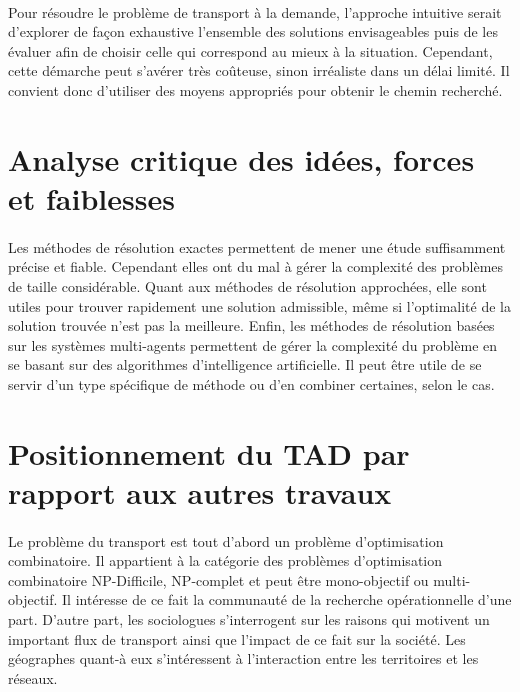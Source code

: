 \documentclass{article}
\begin{document}
\paragraph{}
Pour résoudre le problème de transport à la demande, l'approche intuitive serait d'explorer de façon exhaustive l'ensemble des solutions envisageables puis de les évaluer afin de choisir celle qui correspond au mieux à la situation. Cependant, cette démarche peut s'avérer très coûteuse, sinon irréaliste dans un délai limité. Il convient donc d'utiliser des moyens appropriés pour obtenir le chemin recherché.


\section{Analyse critique des idées, forces et faiblesses}

\paragraph{}
Les méthodes de résolution exactes permettent de mener une étude suffisamment précise et fiable. Cependant elles ont du mal à gérer la complexité des problèmes de taille considérable. Quant aux méthodes de résolution approchées, elle sont utiles pour trouver rapidement une solution admissible, même si l'optimalité de la solution trouvée n'est pas la meilleure. Enfin, les méthodes de résolution basées sur les systèmes multi-agents permettent de gérer la complexité du problème en se basant sur des algorithmes d'intelligence artificielle. Il peut être utile de se servir d'un type spécifique de méthode ou d'en combiner certaines, selon le cas.

\section{Positionnement du TAD par rapport aux autres travaux}

\paragraph{}
Le problème du transport est tout d'abord un problème d'optimisation combinatoire. Il appartient à la catégorie des problèmes d’optimisation combinatoire NP-Difficile, NP-complet et peut être mono-objectif ou multi-objectif. Il intéresse de ce fait la communauté de la recherche opérationnelle d'une part. D'autre part, les sociologues s'interrogent sur les raisons qui motivent un important flux de transport ainsi que l'impact de ce fait sur la société. Les géographes quant-à eux s'intéressent à l'interaction entre les territoires et les réseaux.
\end{document}
